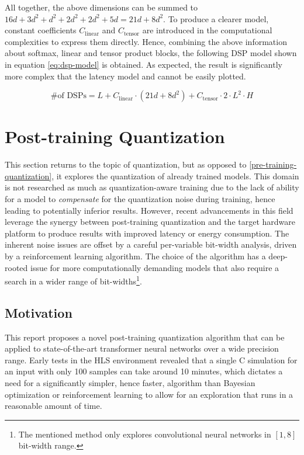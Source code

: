 All together, the above dimensions can be summed to \(16d + 3d^2 + d^2 + 2d^2 + 2d^2 + 5d = 21d + 8d^2\). To produce a clearer model, constant coefficients \(C_{\text{linear}}\) and \(C_{\text{tensor}}\) are introduced in the computational complexities to express them directly. Hence, combining the above information about softmax, linear and tensor product blocks, the following DSP model shown in equation \ref{eq:dsp-model} is obtained. As expected, the result is significantly more complex that the latency model and cannot be easily plotted.

\begin{equation} \label{eq:dsp-model}
  \text{\# of DSPs} = L + C_{\text{linear}} \cdot (21d + 8d^2) + C_{\text{tensor}} \cdot 2 \cdot L^2 \cdot H
\end{equation}


\section{Post-training Quantization}\label{post-training-quantization}
This section returns to the topic of quantization, but as opposed to \cref{pre-training-quantization}, it explores the quantization of already trained models. This domain is not researched as much as quantization-aware training due to the lack of ability for a model to \textit{compensate} for the quantization noise during training, hence leading to potentially inferior results. However, recent advancements in this field \cite{80-wang2019haq:} leverage the synergy between post-training quantization and the target hardware platform to produce results with improved latency or energy consumption. The inherent noise issues are offset by a careful per-variable bit-width analysis, driven by a reinforcement learning algorithm. The choice of the algorithm has a deep-rooted issue for more computationally demanding models that also require a search in a wider range of bit-widths\footnote{The mentioned method only explores convolutional neural networks in \([1, 8]\) bit-width range.}.

\subsection{Motivation}
This report proposes a novel post-training quantization algorithm that can be applied to state-of-the-art transformer neural networks over a wide precision range. Early tests in the HLS environment revealed that a single C simulation for an input with only 100 samples can take around 10 minutes, which dictates a need for a significantly simpler, hence faster, algorithm than Bayesian optimization or reinforcement learning to allow for an exploration that runs in a reasonable amount of time.


